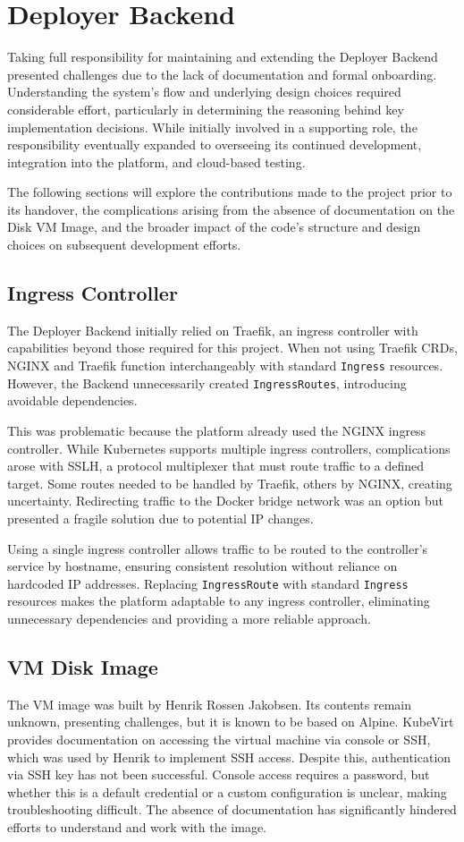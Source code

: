 \section{Deployer Backend}
Taking full responsibility for maintaining and extending the Deployer Backend presented challenges due to the lack of documentation and formal onboarding. Understanding the system's flow and underlying design choices required considerable effort, particularly in determining the reasoning behind key implementation decisions. While initially involved in a supporting role, the responsibility eventually expanded to overseeing its continued development, integration into the platform, and cloud-based testing.

The following sections will explore the contributions made to the project prior to its handover, the complications arising from the absence of documentation on the Disk VM Image, and the broader impact of the code's structure and design choices on subsequent development efforts.

\subsection{Ingress Controller}
The Deployer Backend initially relied on Traefik, an ingress controller with capabilities beyond those required for this project. When not using Traefik CRDs, NGINX and Traefik function interchangeably with standard \texttt{Ingress} resources. However, the Backend unnecessarily created \texttt{IngressRoutes}, introducing avoidable dependencies.

This was problematic because the platform already used the NGINX ingress controller. While Kubernetes supports multiple ingress controllers, complications arose with SSLH, a protocol multiplexer that must route traffic to a defined target. Some routes needed to be handled by Traefik, others by NGINX, creating uncertainty. Redirecting traffic to the Docker bridge network was an option but presented a fragile solution due to potential IP changes.

Using a single ingress controller allows traffic to be routed to the controller's service by hostname, ensuring consistent resolution without reliance on hardcoded IP addresses. Replacing \texttt{IngressRoute} with standard \texttt{Ingress} resources makes the platform adaptable to any ingress controller, eliminating unnecessary dependencies and providing a more reliable approach.

\subsection{VM Disk Image}
The VM image was built by Henrik Rossen Jakobsen. Its contents remain unknown, presenting challenges, but it is known to be based on Alpine. KubeVirt provides documentation on accessing the virtual machine via console or SSH, which was used by Henrik to implement SSH access. Despite this, authentication via SSH key has not been successful. Console access requires a password, but whether this is a default credential or a custom configuration is unclear, making troubleshooting difficult. The absence of documentation has significantly hindered efforts to understand and work with the image.


